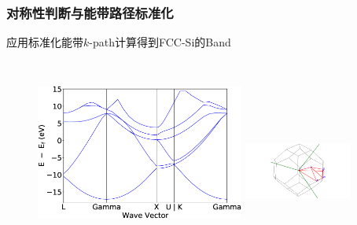 \documentclass[cjk,slidestop,handout,compress,mathserif,blue]{beamer}	%
\begin{document}
%
\frame
{
	\frametitle{对称性判断与能带路径标准化}
	应用标准化能带$k$-\textrm{path}计算得到\textrm{FCC-Si}的\textrm{Band}\\{\fontsize{7.3pt}{6.2pt}}\\

\begin{figure}[h!]
\centering
\vspace*{-0.1in}
\includegraphics[height=2.0in,width=2.7in,viewport=0 0 890 570,clip]{Figures/FCC_Si-Band_pymatgen.eps}
\hspace*{0.01in}
\includegraphics[height=1.5in,width=1.4in,viewport=280 0 850 600,clip]{Figures/FCC_Si-Brillouin-zone.png}
\caption{\fontsize{7.2pt}{4.2pt}}%
\label{FCC_Si-Band}
\end{figure} 
}
\end{document}

